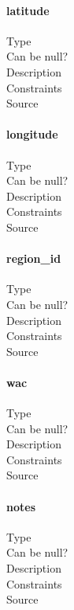\documentclass[]{report}
\begin{document}
\paragraph{latitude}
	\begin{description}
	\item[Type]
	\item[Can be null?]
	\item[Description]
	\item[Constraints]
	\item[Source]
	\end{description}
\paragraph{longitude}
	\begin{description}
	\item[Type]
	\item[Can be null?]
	\item[Description]
	\item[Constraints]
	\item[Source]
	\end{description}
\paragraph{region\_id}
	\begin{description}
	\item[Type]
	\item[Can be null?]
	\item[Description]
	\item[Constraints]
	\item[Source]
	\end{description}
\paragraph{wac}
	\begin{description}
	\item[Type]
	\item[Can be null?]
	\item[Description]
	\item[Constraints]
	\item[Source]
	\end{description}
\paragraph{notes}
	\begin{description}
	\item[Type]
	\item[Can be null?]
	\item[Description]
	\item[Constraints]
	\item[Source]
	\end{description}
\end{document}
